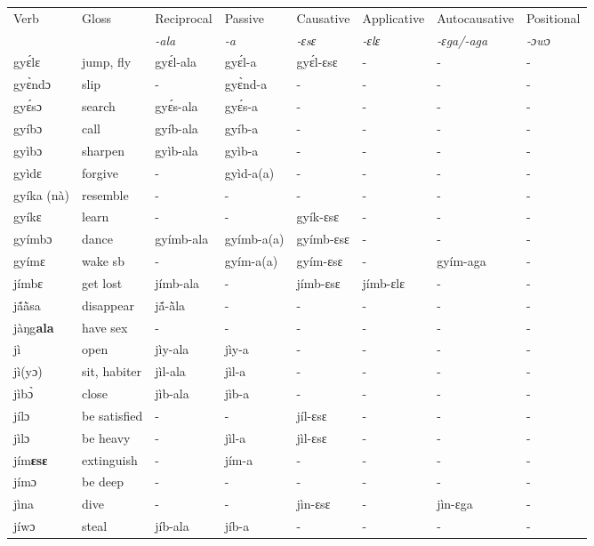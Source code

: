 \begin{sidewaystable}
\begin{tabular}{llllllll}
 \lsptoprule
 Verb & Gloss & Reciprocal & Passive  & Causative  & Applicative   & Autocausative & Positional   \\
  &    & {\itshape -ala} & {\itshape -a} & {\itshape -ɛsɛ} & {\itshape -ɛlɛ} & {\itshape -ɛga/-aga}  & {\itshape -ɔwɔ}  \\
\midrule
gyɛ́lɛ & jump, fly & gyɛ́l-ala & gyɛ́l-a & gyɛ́l-ɛsɛ & - & - &  - \\ 
gyɛ̀ndɔ & slip & - &  gyɛ̀nd-a & - & - & - & - \\
gyɛ́sɔ & search & gyɛ́s-ala & gyɛ́s-a & - & - & - & - \\
gyíbɔ & call & gyíb-ala & gyíb-a  & - & - & - & - \\
gyìbɔ & sharpen & gyìb-ala & gyìb-a & - & - & - & - \\
gyìdɛ & forgive & - & gyìd-a(a) & - & - & - & - \\
gyíka (nà) & resemble & - & - & - & - & - & - \\
gyíkɛ & learn & - & - & gyík-ɛsɛ & - & - & - \\
gyímbɔ & dance & gyímb-ala &  gyímb-a(a) & gyímb-ɛsɛ & - & - & - \\
gyímɛ & wake sb & - & gyím-a(a) & gyím-ɛsɛ & - & gyím-aga & - \\
jímbɛ & get lost & jímb-ala & - & jímb-ɛsɛ & jímb-ɛlɛ  & - & - \\
jã́ã̀sa & disappear & jã́-ã̀la & - & - & -  & - & - \\
jàŋg{\bfseries ala} & have sex & - & - & - & - & - & - \\
jì & open & jìy-ala & jìy-a & - & - & - & - \\
jì(yɔ) & sit, habiter & jìl-ala & jìl-a  & - & - & - & - \\
jìbɔ̀ & close & jìb-ala & jìb-a & - & - & - & - \\
jílɔ & be satisfied & - & - & jíl-ɛsɛ & - & - & - \\
jìlɔ & be heavy & - & jìl-a & jìl-ɛsɛ & - & - &  - \\
jím{\bfseries ɛsɛ} & extinguish & - & jím-a & - & - & - &  - \\
jímɔ & be deep & - & - & - & - &  - & -  \\
jìna & dive & - & - & jìn-ɛsɛ & - & jìn-ɛga & - \\
jíwɔ & steal & jíb-ala & jíb-a & - & - & - & - \\
\midrule\end{tabular}\end{sidewaystable}

